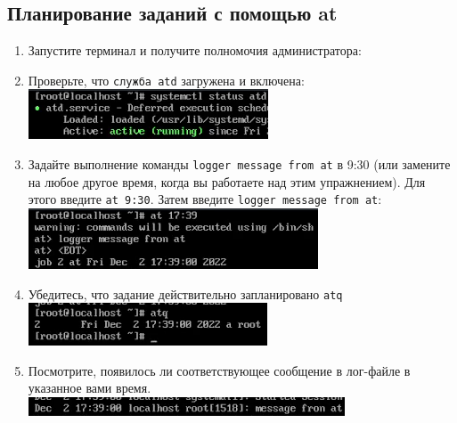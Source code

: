 \documentclass[12pt]{article}
\begin{document}
\subsection{Планирование заданий с помощью at}
\begin{enumerate}
	\item Запустите терминал и получите полномочия администратора:
	\item Проверьте, что \texttt{служба atd} загружена и включена:
	      \\\includegraphics{14.png}
	\item Задайте выполнение команды \texttt{logger message from at} в 9:30 (или замените на любое другое время, когда вы работаете над этим упражнением). Для этого введите \texttt{at 9:30}. Затем введите \texttt{logger message from at}:
	      \\\includegraphics{15.png}
	\item Убедитесь, что задание действительно запланировано \texttt{atq}
	      \\\includegraphics{16.png}
	\item Посмотрите, появилось ли соответствующее сообщение в лог-файле в указанное вами время.
	      \\\includegraphics{17.png}
\end{enumerate}
\end{document}
